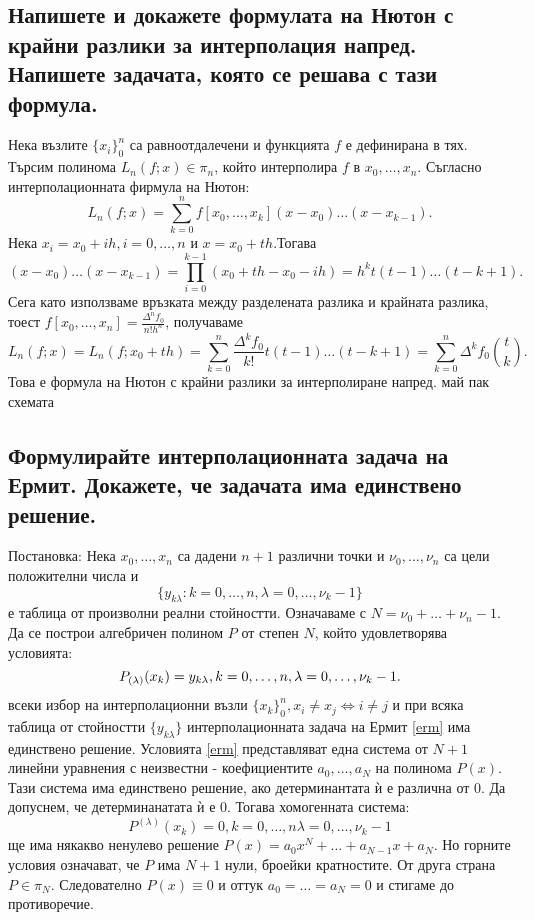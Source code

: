 \documentclass[12pt]{article}
\numberwithin{equation}{subsection}
\numberwithin{theorem}{subsection}
\numberwithin{definition}{subsection}
\numberwithin{corollary}{subsection}
\begin{document}
\subsection{Напишете и докажете формулата на Нютон с крайни разлики за интерполация напред. Напишете задачата, която се решава с тази формула.}
  Нека възлите $\{x_i\}_0^n$ са равноотдалечени и функцията $f$ е дефинирана в тях. Търсим полинома $L_n(f;x)\in\pi_n$, който интерполира $f$ в $x_0,\ldots,x_n$. Съгласно интерполационната фирмула на Нютон:
  \begin{equation*}
    L_n(f;x)=\sum_{k=0}^{n}f[x_0,\ldots,x_k](x-x_0)\ldots(x-x_{k-1}).
  \end{equation*}
  Нека $x_i=x_0 + ih, i=0,\ldots,n$ и $x = x_0+th$.Тогава
  \begin{equation*}
    (x-x_0)\ldots(x-x_{k-1})=\prod_{i=0}^{k-1}(x_0+th-x_0-ih)=h^kt(t-1)\ldots(t-k+1).
  \end{equation*}
  Сега като използваме връзката между разделената разлика и крайната разлика, тоест $f[x_0,\ldots,x_n]=\frac{\Delta^nf_0}{n!h^n}$, получаваме
  \begin{equation*}
    L_n(f;x)=L_n(f;x_0+th)=\sum_{k=0}^{n}\frac{\Delta^kf_0}{k!}t(t-1)\ldots(t-k+1)=\boxed{\sum_{k=0}^{n}\Delta^kf_0\genfrac(){0pt}{0}{t}{k}}.
  \end{equation*}
  Това е формула на Нютон с крайни разлики за интерполиране напред.
  май пак схемата

\subsection{Формулирайте интерполационната задача на Ермит. Докажете, че задачата има единствено решение.}
  Постановка:
  Нека $x_0,\ldots,x_n$ са дадени $n+1$ различни точки и $\nu_0,\ldots,\nu_n$ са цели положителни числа и
  \begin{equation*}
    \{y_{k\lambda}:k=0, \ldots, n, \lambda=0,\ldots,\nu_k-1\}
  \end{equation*}
  е таблица от произволни реални стойностти. Означаваме с $N=\nu_0+\ldots+\nu_n-1$. Да се построи алгебричен полином $P$ от степен $N$, който удовлетворява условията:
  \begin{equation}\label{erm}
    P_{(\lambda)}(x_k)=y_{k\lambda},\hfill k=0, \ldots, n, \lambda=0,\ldots,\nu_k-1.
  \end{equation}
   всеки избор на интерполационни възли $\{x_k\}_0^n, x_i\neq x_j\Leftrightarrow i \neq j$ и при всяка таблица от стойностти $\{y_{k\lambda}\}$ интерполационната задача на Ермит \ref{erm} има единствено решение.
  \proof
  Условията \ref{erm} представляват една система от $N+1 $ линейни уравнения с неизвестни - коефициентите $a_0,\ldots,a_N$ на полинома $P(x)$. Тази система има единствено решение, ако детерминантата ѝ е различна от $0$. Да допуснем, че детерминанатата ѝ е $0$. Тогава хомогенната система:
  \begin{equation*}
    P^{(\lambda)}(x_k) = 0, k=0,\ldots,n \lambda=0,\ldots,\nu_k-1
  \end{equation*}
  ще има някакво ненулево решение $P(x)=a_0x^N+\ldots+a_{N-1}x + a_N$. Но горните условия означават, че $P$ има $N+1$ нули, броейки кратностите. От друга страна $P\in\pi_N$. Следователно $P(x)\equiv0$ и оттук $a_0=\ldots=a_N=0$ и стигаме до противоречие.
\end{document}
